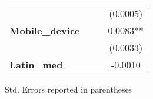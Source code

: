 \begin{center}
\begin{tabular}{lccc}
\textbf{ }                                  &                  &                  &     (0.0005)      \\
\textbf{Mobile\_device}                     &                  &                  &     0.0083**      \\
\textbf{ }                                  &                  &                  &     (0.0033)      \\
\textbf{Latin\_med}                         &                  &                  &     -0.0010       \\
\bottomrule
\end{tabular}
\end{center}

Std. Errors reported in parentheses